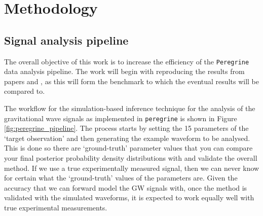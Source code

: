 \section{Methodology}
\label{sec:methodology}

\subsection{Signal analysis pipeline}

The overall objective of this work is to increase the efficiency of the \texttt{Peregrine} data analysis pipeline. The work will begin with reproducing the results from papers \cite{bhardwaj2023peregrine} and \cite{alvey2023things}, as this will form the benchmark to which the eventual results will be compared to.

The workflow for the simulation-based inference technique for the analysis of the gravitational wave signals as implemented in \texttt{peregrine} \cite{bhardwaj2023peregrine} is shown in Figure \ref{fig:peregrine_pipeline}. The process starts by setting the 15 parameters of the `target observation' and then generating the example waveform to be analysed. This is done so there are `ground-truth' parameter values that you can compare your final posterior probability density distributions with and validate the overall method. If we use a true experimentally measured signal, then we can never know for certain what the `ground-truth' values of the parameters are. Given the accuracy that we can forward model the GW signals with, once the method is validated with the simulated waveforms, it is expected to work equally well with true experimental measurements.

